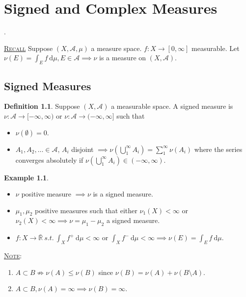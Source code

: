 \documentclass{report}
\newcommand{\R}{\mathbb{R}}
\newcommand{\st}{\ s.t.\ }
\newcommand{\cA}{\mathcal{A}}
\newcommand{\df}{\ \mathrm{d}}
\newcommand{\fancyem}[1]{\underline{\textsc{#1}}}
\theoremstyle{definition}
\newtheorem{definition}[theorem]{Definition}
\newtheorem{example}[theorem]{Example}
\theoremstyle{remark}
\newcommand{\fnl}{\parbox[t]{0\linewidth}{}}
\begin{document}
\chapter{Signed and Complex Measures}
\cite[Ch.3]{follandRealAnalysisModern1999}.

\fancyem{Recall} Suppose $(X, \cA, \mu)$ a measure space. $f: X \to [0, \infty]$ measurable. Let $\displaystyle \nu(E) = \int_E f \df \mu, E \in \cA \implies \nu$ is a measure on $(X, \cA)$. 

\section{Signed Measures}
\begin{definition}
	Suppose $(X, \cA)$ a measurable space. A signed measure is $\nu: \cA \to [-\infty, \infty)$ or $\nu: \cA \to (-\infty, \infty]$ such that \begin{itemize}
		\item $\nu(\emptyset) = 0$.
		\item $A_1, A_2, \ldots \in \cA$, $A_i$ disjoint $\implies \displaystyle \nu\left(\bigcup_1^\infty A_i\right) = \sum_1^\infty \nu(A_i)$ where the series converges absolutely if $\displaystyle \nu\left(\bigcup_1^\infty A_i\right) \in (-\infty, \infty)$.
	\end{itemize}
\end{definition}
\begin{example}\fnl
	\begin{itemize}
		\item $\nu$ positive measure $\implies \nu$ is a signed measure.
		\item $\mu_1, \mu_2$ positive measures such that either $\nu_1(X) < \infty$ or $\nu_2(X) < \infty \implies  \nu = \mu_1 - \mu_2$ a signed measure.
		\item $f: X \to \bar{\R} \st \displaystyle \int_X f^+ \df \mu < \infty$ or $\displaystyle \int_X f^- \df \mu < \infty \implies \nu(E) = \int_E f \df \mu$.
	\end{itemize}
\end{example}

\fancyem{Note}: 
\begin{enumerate}
	\item $A \subset B \nRightarrow \nu(A) \leq \nu(B)$ since $\nu(B) = \nu(A) + \nu(B \setminus A)$.
	\item $A \subset B, \nu(A) = \infty \implies \nu(B) = \infty$.
\end{enumerate}
\end{document}
